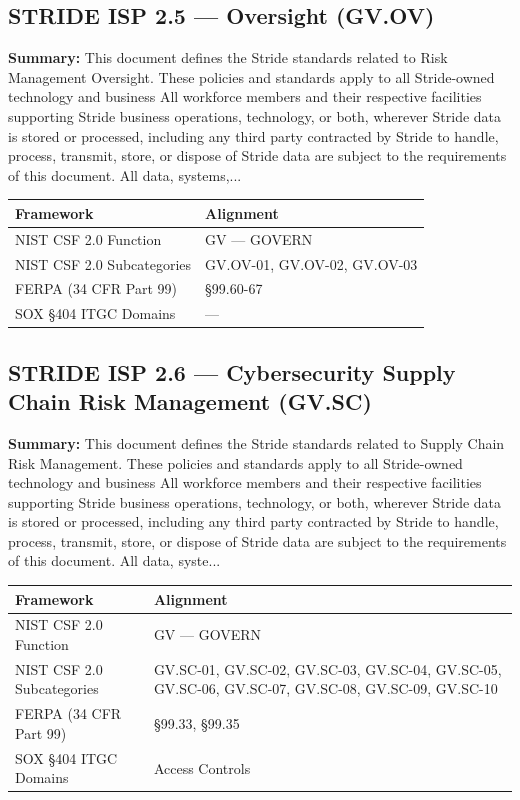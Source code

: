 \documentclass[11pt,landscape]{article}
\begin{document}
\subsection{\textcolor{strideblue}{STRIDE ISP 2.5} --- Oversight (GV.OV)}
\label{pol:ISP25}

\textbf{Summary:} This document defines the Stride standards related to Risk Management Oversight. These policies and standards apply to all Stride-owned technology and business All workforce members and their respective facilities supporting Stride business operations, technology, or both, wherever Stride data is stored or processed, including any third party contracted by Stride to handle, process, transmit, store, or dispose of Stride data are subject to the requirements of this document. All data, systems,...

\begin{tabularx}{\textwidth}{|p{4cm}|X|}
\hline
\rowcolor{headgray} \textbf{Framework} & \textbf{Alignment} \\
\hline
NIST CSF 2.0 Function & GV --- GOVERN \\
\hline
NIST CSF 2.0 Subcategories & GV.OV-01, GV.OV-02, GV.OV-03 \\
\hline
FERPA (34 CFR Part 99) & §99.60-67 \\
\hline
SOX §404 ITGC Domains & --- \\
\hline
\end{tabularx}


\subsection{\textcolor{strideblue}{STRIDE ISP 2.6} --- Cybersecurity Supply Chain Risk Management (GV.SC)}
\label{pol:ISP26}

\textbf{Summary:} This document defines the Stride standards related to Supply Chain Risk Management. These policies and standards apply to all Stride-owned technology and business All workforce members and their respective facilities supporting Stride business operations, technology, or both, wherever Stride data is stored or processed, including any third party contracted by Stride to handle, process, transmit, store, or dispose of Stride data are subject to the requirements of this document. All data, syste...

\begin{tabularx}{\textwidth}{|p{4cm}|X|}
\hline
\rowcolor{headgray} \textbf{Framework} & \textbf{Alignment} \\
\hline
NIST CSF 2.0 Function & GV --- GOVERN \\
\hline
NIST CSF 2.0 Subcategories & GV.SC-01, GV.SC-02, GV.SC-03, GV.SC-04, GV.SC-05, GV.SC-06, GV.SC-07, GV.SC-08, GV.SC-09, GV.SC-10 \\
\hline
FERPA (34 CFR Part 99) & §99.33, §99.35 \\
\hline
SOX §404 ITGC Domains & Access Controls \\
\hline
\end{tabularx}
\end{document}
